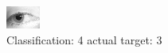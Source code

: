 \begin{figure}[h!]
\begin{center}
\includegraphics[width=0.60\columnwidth]{figures/ID1354_class_4_target_3.png}
\end{center}
\caption{ Classification: 4 actual target: 3}
\label{fig:ID1354_class_4_target_3}
\end{figure}
